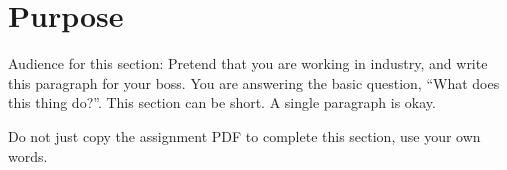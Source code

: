 \documentclass{article}
\title{\ASSIGNMENT}
\author{\NAME}
\date{\CLASS}
\begin{document}
\pagestyle{fancy}
\fancyfoot{}
\fancyhead{}
\fancyfoot[L]{\ASSIGNMENT\ -- \CLASS\ -- \NAME}
\fancyfoot[R]{\thepage}

\maketitle



\section*{Purpose}

Audience for this section: Pretend that
you are working in industry, and write
this paragraph for your boss. You are
answering the basic question, ``What does
this thing do?''. This section can be
short. A single paragraph is okay. 

Do not just copy the assignment PDF to complete this section, use your own words. 
\end{document}
